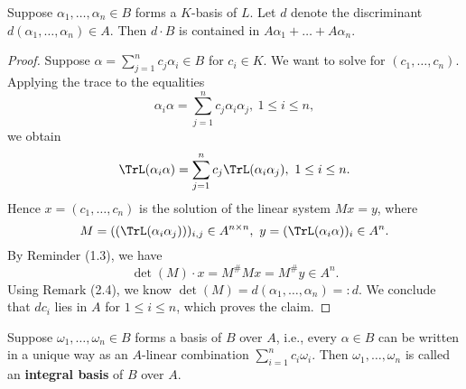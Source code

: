 \begin{Prop}
	Suppose $\alpha_1,\dots,\alpha_n\in B$ forms a $K$-basis of $L$. Let $d$ denote the discriminant $d(\alpha_1,\dots,\alpha_n)\in A$. Then $d\cdot B$ is contained in $A\alpha_1+\dots+A\alpha_n$.
\end{Prop}

\begin{proof}
	Suppose $\alpha=\sum_{j=1}^{n} c_j\alpha_i\in B$ for $c_i\in K$. We want to solve for $(c_1,\dots,c_n)$. Applying the trace to the equalities
	$$\alpha_i\alpha=\sum_{j=1}^{n} c_j\alpha_i\alpha_j,~1\le i\le n,$$
	we obtain
	$$\TrL(\alpha_i\alpha)=\sum_{j=1}^{n} c_j \TrL(\alpha_i\alpha_j),~1\le i\le n.$$
	Hence $x=(c_1,\dots,c_n)$ is the solution of the linear system $Mx=y$, where 
	$$M=((\TrL(\alpha_i\alpha_j)))_{i,j}\in A^{n\times n}, ~ y=(\TrL(\alpha_i\alpha))_i\in A^n.$$
	By Reminder (1.3), we have 
	$$\det(M)\cdot x=M^\#Mx=M^\#y\in A^n.$$
	Using Remark (2.4), we know $\det(M)=d(\alpha_1,\dots,\alpha_n)=:d$. We conclude that $dc_i$ lies in $A$ for $1\le i\le n$, which proves the claim.
\end{proof}

\begin{defi}[Ganzheitsbasis]
	Suppose $\omega_1,\dots,\omega_n\in B$ forms a basis of $B$ over $A$, i.e., every $\alpha\in B$ can be written in a unique way as an $A$-linear combination $\sum_{i=1}^{n}c_i\omega_i$. Then $\omega_1,\dots,\omega_n$ is called an \textbf{integral basis} of $B$ over $A$.
\end{defi}